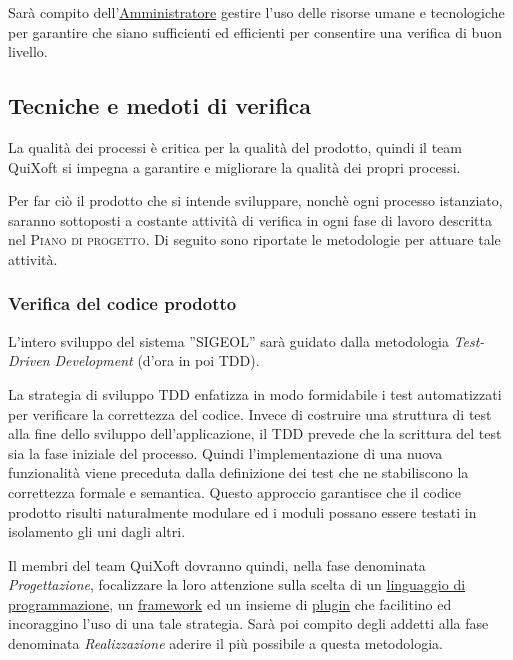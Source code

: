 \documentclass[11pt,a4paper]{article}
\begin{document}
Sarà compito dell'\underline{Amministratore} gestire l'uso delle risorse umane e tecnologiche per garantire che siano sufficienti ed efficienti per consentire una verifica di buon livello.
\subsection{Tecniche e medoti di verifica}
La qualità dei processi è critica per la qualità del prodotto, quindi il team QuiXoft si impegna a garantire e migliorare la qualità dei propri processi.

Per far ciò il prodotto che si intende sviluppare, nonchè ogni processo istanziato, saranno sottoposti a costante attività di verifica in ogni fase di lavoro descritta nel \textsc{Piano di progetto}. Di seguito sono riportate le metodologie per attuare tale attività.
\subsubsection{Verifica del codice prodotto}
L'intero sviluppo del sistema ''SIGEOL'' sarà guidato dalla metodologia \textit{Test-Driven Development} (d'ora in poi TDD).

La strategia di sviluppo TDD enfatizza in modo formidabile i test automatizzati per verificare la correttezza del codice. Invece di costruire una struttura di test alla fine dello sviluppo dell’applicazione, il TDD prevede che la scrittura del test sia la fase iniziale del processo. Quindi l’implementazione di una nuova funzionalità viene preceduta dalla definizione dei test che ne stabiliscono la correttezza formale e semantica. Questo approccio garantisce che il codice prodotto risulti naturalmente modulare ed i moduli possano essere testati in isolamento gli uni dagli altri.

Il membri del team QuiXoft dovranno quindi, nella fase denominata \textit{Proget\-tazione}, focalizzare la loro attenzione sulla scelta di un \underline{linguaggio di} \underline{programmazione}, un \underline{framework} ed un insieme di \underline{plugin} che facilitino ed incoraggino l'uso di una tale strategia. Sarà poi compito degli addetti alla fase denominata \textit{Realizzazione} aderire il più possibile a questa metodologia.
\end{document}
